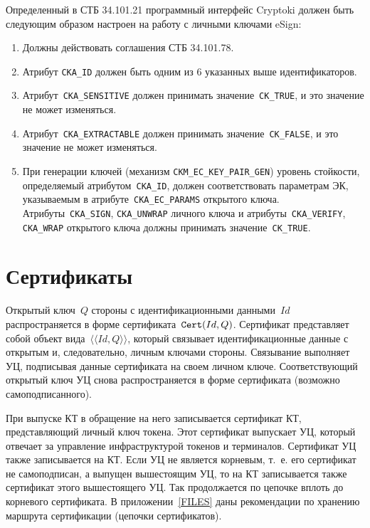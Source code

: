 Определенный в СТБ 34.101.21 программный интерфейс Cryptoki должен быть
следующим образом настроен на работу с личными ключами eSign:
\begin{enumerate}
\item
Должны действовать соглашения СТБ 34.101.78.
\item
Атрибут \verb|CKA_ID| должен быть одним из 6 указанных выше идентификаторов.
\item
Атрибут~\verb|CKA_SENSITIVE| должен принимать значение~\verb|CK_TRUE|,
и это значение не может изменяться.
\item
Атрибут~\verb|CKA_EXTRACTABLE| должен принимать значение~\verb|CK_FALSE|,
и это значение не может изменяться.
\item
При генерации ключей (механизм \verb|CKM_EC_KEY_PAIR_GEN|) уровень стойкости, 
определяемый атрибутом~\verb|CKA_ID|, должен соответствовать параметрам ЭК, 
указываемым в атрибуте~\verb|CKA_EC_PARAMS| открытого ключа. 
Атрибуты~\verb|CKA_SIGN|, \verb|CKA_UNWRAP| личного ключа и 
атрибуты~\verb|CKA_VERIFY|, \verb|CKA_WRAP| открытого ключа должны принимать 
значение~\verb|CK_TRUE|.
\end{enumerate}

\section{Сертификаты}\label{OBJ.Certs}

Открытый ключ~$Q$ стороны с идентификационными данными~$Id$ распространяется в 
форме сертификата~$\texttt{Cert}(Id,Q)$. 
%
Сертификат представляет собой объект вида~$\langle\langle Id,Q\rangle\rangle$,
который связывает идентификационные данные с открытым и, следовательно, личным 
ключами стороны. 
%
Связывание выполняет УЦ, подписывая данные сертификата на своем личном ключе. 
Соответствующий открытый ключ УЦ снова распространяется в форме сертификата 
(возможно самоподписанного).

При выпуске КТ в обращение на него записывается сертификат КТ, представляющий
личный ключ токена. Этот сертификат выпускает УЦ, который отвечает за управление
инфраструктурой токенов и терминалов. Сертификат УЦ также записывается на КТ.
Если УЦ не является корневым, т.~е. его сертификат не самоподписан, а выпущен 
вышестоящим УЦ, то на КТ записывается также сертификат этого вышестоящего УЦ. 
Так продолжается по цепочке вплоть до корневого сертификата. 
%
В приложении~\ref{FILES} даны рекомендации по хранению маршрута сертификации 
(цепочки сертификатов).

